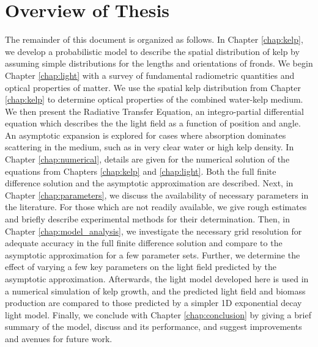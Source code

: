 \section{Overview of Thesis}
The remainder of this document is organized as follows.
In Chapter \ref{chap:kelp}, we develop a probabilistic model to describe the spatial distribution of kelp by assuming simple distributions for the lengths and orientations of fronds.
We begin Chapter \ref{chap:light} with a survey of fundamental radiometric quantities and optical properties of matter.
We use the spatial kelp distribution from Chapter \ref{chap:kelp} to determine optical properties of the combined water-kelp medium.
We then present the Radiative Transfer Equation, an integro-partial differential equation which describes the the light field as a function of position and angle.
An asymptotic expansion is explored for cases where absorption dominates scattering in the medium, such as in very clear water or high kelp density.
In Chapter \ref{chap:numerical}, details are given for the numerical solution of the equations from Chapters \ref{chap:kelp} and \ref{chap:light}.
Both the full finite difference solution and the asymptotic approximation are described.
Next, in Chapter \ref{chap:parameters}, we discuss the availability of necessary parameters in the literature.
For those which are not readily available, we give rough estimates and briefly describe experimental methods for their determination.
Then, in Chapter \ref{chap:model_analysis}, we investigate the necessary grid resolution for adequate accuracy in the full finite difference solution and compare to the asymptotic approximation for a few parameter sets.
Further, we determine the effect of varying a few key parameters on the light field predicted by the asymptotic approximation.
Afterwards, the light model developed here is used in a numerical simulation of kelp growth, and the predicted light field and biomass production are compared to those predicted by a simpler 1D exponential decay light model.
Finally, we conclude with Chapter \ref{chap:conclusion} by giving a brief summary of the model, discuss and its performance, and suggest improvements and avenues for future work.
